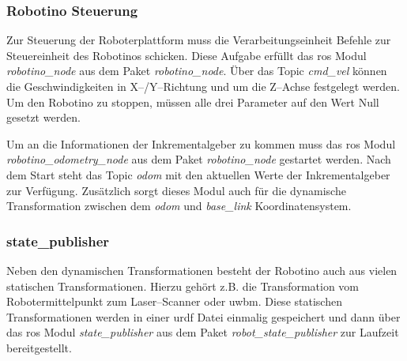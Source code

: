 \subsubsection{Robotino Steuerung}

Zur Steuerung der Roboterplattform muss die Verarbeitungseinheit Befehle zur Steuereinheit des Robotinos schicken. Diese Aufgabe erfüllt das \Gls{ros} Modul \textit{robotino\_node} aus dem Paket \textit{robotino\_node}. Über das Topic \textit{cmd\_vel} können die Geschwindigkeiten in X--/Y--Richtung und um die Z--Achse festgelegt werden. Um den Robotino zu stoppen, müssen alle drei Parameter auf den Wert Null gesetzt werden.

Um an die Informationen der Inkrementalgeber zu kommen muss das \Gls{ros} Modul \textit{robotino\_odometry\_node} aus dem Paket \textit{robotino\_node} gestartet werden. Nach dem Start steht das Topic \textit{odom} mit den aktuellen Werte der Inkrementalgeber zur Verfügung. Zusätzlich sorgt dieses Modul auch für die dynamische Transformation zwischen dem \textit{odom} und \textit{base\_link} Koordinatensystem.


\begin{comment}
--------------------------------------------------------------------------------
<param name="robot_description" textfile="$(find robotino_description)/urdf/robotino.urdf" />
<node pkg="robot_state_publisher" type="state_publisher" name="robot_state_publisher" output="screen">
	<param name="publish_frequency" type="double" value="20.0" />
</node>

- TODO: Bild von dem Robotino + TF Tree
- TODO: Laser--Scanner?
- TODO: UWB--Modul und ROS Modul?
- \url{http://wiki.ros.org/robot_state_publisher}
- \url{http://wiki.ros.org/urdf}
\end{comment}
\subsubsection{state\_publisher}

Neben den dynamischen Transformationen besteht der Robotino auch aus vielen statischen Transformationen. Hierzu gehört z.B. die Transformation vom Robotermittelpunkt zum Laser--Scanner oder \Gls{uwbm}. Diese statischen Transformationen werden in einer \Gls{urdf} Datei einmalig gespeichert und dann über das \Gls{ros} Modul \textit{state\_publisher} aus dem Paket \textit{robot\_state\_publisher} zur Laufzeit bereitgestellt.


